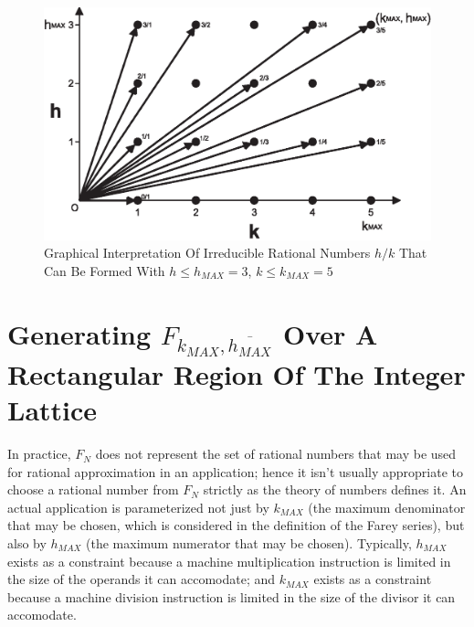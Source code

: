 \begin{figure}
\centering
\includegraphics[width=4.6in]{c_fry0/farey01b.eps}
\caption{Graphical Interpretation Of Irreducible Rational Numbers 
         $h/k$ That Can Be Formed With $h \leq h_{MAX}=3$, $k \leq k_{MAX}=5$}
\label{fig:cfry0:chk0:01}
\end{figure}


\section[Generating $F_{k_{MAX}, \overline{h_{MAX}}}$ In A Rectangular Region]
        {Generating \mbox{\boldmath $F_{k_{MAX}, \overline{h_{MAX}}}$}
         Over A Rectangular Region Of The Integer Lattice}
\label{cfry0:schk0}

In practice, $F_N$ does not represent the set of
rational numbers that may be used for rational approximation in an
application; hence it isn't usually appropriate to choose a
rational number from $F_N$ strictly as
the theory of numbers defines it.  
An actual application is parameterized not just by
$k_{MAX}$ (the maximum denominator that may be chosen, which is considered
in the definition of the Farey series), 
but also by $h_{MAX}$ (the maximum numerator
that may be chosen).  Typically, $h_{MAX}$ exists as a constraint
because a machine multiplication instruction is limited in the size of the
operands it can accomodate; and $k_{MAX}$ exists as a constraint because
a machine division instruction is limited in the size of the divisor
it can accomodate.

